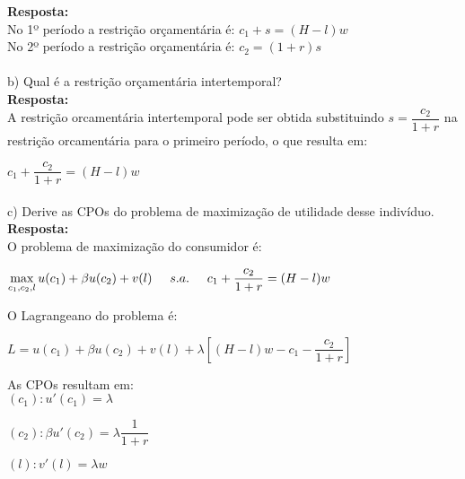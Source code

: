 \begin{enumerate}
\textbf{Resposta:}\\ 

No 1º período a restrição orçamentária é: {$c_1 + s = (H - l)w$}\\

No 2º período a restrição orçamentária é: {$c_2 = (1 + r)s$}

\paragraph{} b) Qual é a restrição orçamentária intertemporal?\\

\textbf{Resposta:}\\
A restrição orcamentária intertemporal pode ser obtida substituindo {$s = \dfrac{c_2}{1+r}$} na restrição orcamentária para o primeiro período, o que resulta em:
\\
\begin{center}
{$ c_1 + \dfrac{c_2}{1+r} = (H - l)w$}
\end{center}

\paragraph{} c) Derive as CPOs do problema de maximização de utilidade desse indivíduo.\\

\textbf{Resposta:}\\

O problema de maximização do consumidor é:

\begin{center}
{$ \displaystyle\max_{c_1, c_2, l} u(c_1) + \beta u(c_2) + v(l) \hspace{0,5cm} s. a. \hspace{0,5cm} c_1 + \dfrac{c_2}{1+r} = (H - l)w$}
\end{center}

O Lagrangeano do problema é:\\

\begin{center}
{$ L = u (c_1) + \beta u (c_2) + v(l) + \lambda \left[ (H - l)w - c_1 - \dfrac{c_2}{1+r} \right]$}
\end{center}
As CPOs resultam em:\\


{$(c_1): u'(c_1) = \lambda$}

{$(c_2): \beta u'(c_2) = \lambda \dfrac{1}{1+r}$}

{$(l): v'(l) =  \lambda w$}


\end{enumerate}
